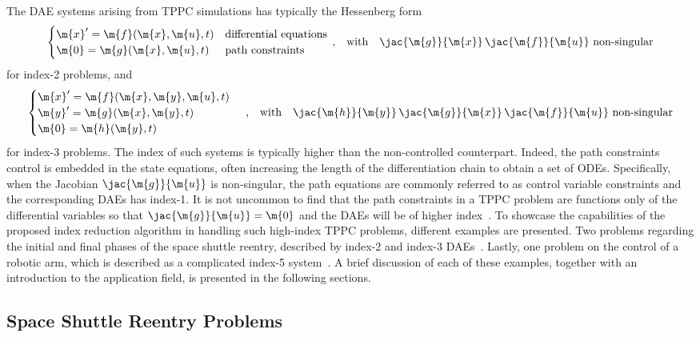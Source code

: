 The \ac{DAE} systems arising from \ac{TPPC} simulations has typically the Hessenberg form~\cite{brenan1986numerical}
%
\begin{equation*}
  \begin{cases}
    \m{x}^\prime = \m{f}(\m{x}, \m{u}, t) & \text{differential equations} \\
    \m{0}        = \m{g}(\m{x}, \m{u}, t) & \text{path constraints}
  \end{cases} \, \text{,}
  \quad \text{with} \quad \jac{\m{g}}{\m{x}} \, \jac{\m{f}}{\m{u}} ~ \text{non-singular}
  \label{chap4:eq:tppc_dae_index2}
\end{equation*}
%
for index-2 problems, and
%
\begin{equation*}
  \begin{cases}
    \m{x}^\prime = \m{f}(\m{x}, \m{y}, \m{u}, t) \\
    \m{y}^\prime = \m{g}(\m{x}, \m{y}, t) \\
    \m{0}        = \m{h}(\m{y}, t)
  \end{cases} \, \text{,}
  \quad \text{with} \quad \jac{\m{h}}{\m{y}} \, \jac{\m{g}}{\m{x}} \, \jac{\m{f}}{\m{u}} ~ \text{non-singular}
  \label{chap4:eq:tppc_dae_index3}
\end{equation*}
%
for index-3 problems. The index of such systems is typically higher than the non-controlled counterpart. Indeed, the path constraints control is embedded in the state equations, often increasing the length of the differentiation chain to obtain a set of \acp{ODE}. Specifically, when the Jacobian $\jac{\m{g}}{\m{u}}$ is non-singular, the path equations are commonly referred to as control variable constraints and the corresponding \acp{DAE} has index-1. It is not uncommon to find that the path constraints in a \ac{TPPC} problem are functions only of the differential variables so that $\jac{\m{g}}{\m{u}} = \m{0}$ and the \acp{DAE} will be of higher index~\cite{brenan1995numerical}. To showcase the capabilities of the proposed index reduction algorithm in handling such high-index \ac{TPPC} problems, different examples are presented. Two problems regarding the initial and final phases of the space shuttle reentry, described by index-2 and index-3 \acp{DAE}~\cite{brenan1995numerical}. Lastly, one problem on the control of a robotic arm, which is described as a complicated index-5 system~\cite{pryce1998solving}. A brief discussion of each of these examples, together with an introduction to the application field, is presented in the following sections.

\subsection{Space Shuttle Reentry Problems}

